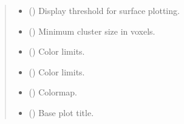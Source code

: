 \documentclass[letterpaper,10pt,english]{sphinxhowto}
\begin{document}
\begin{fulllineitems}
\begin{quote}
\begin{description}
\begin{itemize}
\item {} 
\sphinxAtStartPar
{} (\sphinxstyleliteralemphasis{\sphinxupquote{, }}) \textendash{} Display threshold for surface plotting.

\item {} 
\sphinxAtStartPar
{} (\sphinxstyleliteralemphasis{\sphinxupquote{, }}) \textendash{} Minimum cluster size in voxels.

\item {} 
\sphinxAtStartPar
{} (\sphinxstyleliteralemphasis{\sphinxupquote{, }}) \textendash{} Color limits.

\item {} 
\sphinxAtStartPar
{} (\sphinxstyleliteralemphasis{\sphinxupquote{, }}) \textendash{} Color limits.

\item {} 
\sphinxAtStartPar
{} (\sphinxstyleliteralemphasis{\sphinxupquote{, }}) \textendash{} Colormap.

\item {} 
\sphinxAtStartPar
{} (\sphinxstyleliteralemphasis{\sphinxupquote{, }}) \textendash{} Base plot title.


\end{itemize}
\end{description}
\end{quote}
\end{fulllineitems}
\end{document}
